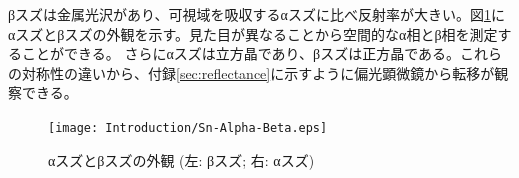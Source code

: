 


βスズは金属光沢があり、可視域を吸収するαスズに比べ反射率が大きい。図\ref{fig:Sn-Alpha-Beta}にαスズとβスズの外観を示す\cite{wiki}。見た目が異なることから空間的なα相とβ相を測定することができる。
さらにαスズは立方晶であり、βスズは正方晶である。これらの対称性の違いから、付録\ref{sec:reflectance}に示すように偏光顕微鏡から転移が観察できる\cite{Matvienko}。
\begin{figure}[!h]
    \begin{center}
   \texttt{[image: Introduction/Sn-Alpha-Beta.eps]}
  \end{center}
  \caption{αスズとβスズの外観 (左: βスズ; 右: αスズ)}
  \label{fig:Sn-Alpha-Beta}
\end{figure}

